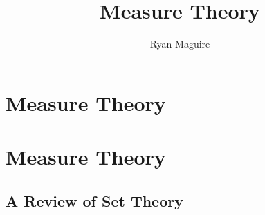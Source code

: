 \documentclass[crop=false,class=book,oneside]{standalone}
\begin{document}
    \ifx\ifmathcourses\undefined
        \title{Measure Theory}
        \author{Ryan Maguire}
        \date{\vspace{-5ex}}
        \maketitle
        \tableofcontents
        \clearpage
        \chapter*{Measure Theory}
        \vspace{10ex}
        \setcounter{chapter}{1}
    \else
        \chapter{Measure Theory}
    \fi
    \section{A Review of Set Theory}
\end{document}
